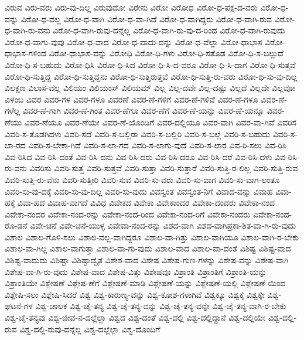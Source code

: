 {ವಿರುವ
ವಿರು-ವರು
ವಿರು-ವು-ದಿಲ್ಲ
ವಿರುವುದೋ
ವಿರೇನು
ವಿರೋ
ವಿರೋಧ
ವಿರೋ-ಧ-ಪಕ್ಷ-ದ-ವರು
ವಿರೋ-ಧ-ವನ್ನು
ವಿರೋ-ಧ-ವಲ್ಲ
ವಿರೋ-ಧ-ವಾಗಿ
ವಿರೋ-ಧ-ವಾ-ಗಿದೆ
ವಿರೋ-ಧ-ವಾಗಿದ್ದರು
ವಿರೋ-ಧ-ವಾಗಿ-ರುವ
ವಿರೋ-ಧ-ವಾಗಿ-ರು-ವನು
ವಿರೋ-ಧ-ವಾಗಿ-ರುವು-ದನ್ನೆಲ್ಲ
ವಿರೋ-ಧ-ವಾಗಿ-ರು-ವು-ದ-ರಿಂದ
ವಿರೋ-ಧ-ವಾಗಿ-ರುವುದು
ವಿರೋ-ಧ-ವಾಗು-ವುವು
ವಿರೋ-ಧ-ವಾದ
ವಿರೋ-ಧ-ವಾದು-ದನ್ನು
ವಿರೋ-ಧ-ವೆಲ್ಲಾ
ವಿರೋ-ಧಾಭಾಸ
ವಿರೋ-ಧಾಭಾಸ-ಗಳಿಂದ
ವಿರೋ-ಧಾಭಾಸ-ವನ್ನು
ವಿರೋಧಿ
ವಿರೋ-ಧಿ-ಗಳು
ವಿರೋ-ಧಿ-ಸತೊಡ
ವಿರೋ-ಧಿ-ಸ-ಬಲ್ಲುದೆ
ವಿರೋ-ಧಿ-ಸ-ಬಹುದು
ವಿರೋ-ಧಿಸಿ
ವಿರೋ-ಧಿ-ಸಿದ
ವಿರೋ-ಧಿ-ಸಿ-ದ-ವರೂ
ವಿರೋ-ಧಿ-ಸಿ-ದಾಗ
ವಿರೋ-ಧಿ-ಸುತ್ತವೆ
ವಿರೋ-ಧಿ-ಸುತ್ತಿದ್ದ
ವಿರೋ-ಧಿ-ಸುತ್ತಿದ್ದನು
ವಿರೋ-ಧಿ-ಸುತ್ತಿರುತ್ತವೆ
ವಿರೋ-ಧಿ-ಸುತ್ತಿ-ರು-ವರು
ವಿರೋ-ಧಿ-ಸು-ವು-ದಿಲ್ಲ
ವಿಲಕ್ಷಣ
ವಿಲಾಸ-ವೆಲ್ಲ
ವಿಲಿಯಂ
ವಿಲಿಯಂಸ್
ವಿಲಿಯಮ್
ವಿಲ್ಲ
ವಿಲ್ಲ-ದವೇ
ವಿಲ್ಲ-ದಷ್ಟು
ವಿಲ್ಲದೆ
ವಿಲ್ಲದೇ
ವಿಲ್ಲವೋ
ವಿಳಂಬ
ವಿವರ
ವಿವರ-ಗಳ
ವಿವರ-ಗಳೂ
ವಿವರಣೆ
ವಿವರ-ಣೆ-ಗಳಿಗೆ
ವಿವರ-ಣೆ-ಗಳಿವೆ
ವಿವರ-ಣೆ-ಗಳೂ
ವಿವರ-ಣೆ-ಗಳೆಲ್ಲ
ವಿವರ-ಣೆ-ಗಾಗಿ
ವಿವರ-ಣೆ-ಗಿಂತ
ವಿವರ-ಣೆಗೂ
ವಿವರ-ಣೆಗೆ
ವಿವರ-ಣೆ-ಯನ್ನು
ವಿವರ-ಣೆ-ಯನ್ನೂ
ವಿವರ-ಣೆಯು
ವಿವರ-ಣೆಯೂ
ವಿವರ-ಣೆಯೇ
ವಿವರ-ಣೆ-ಯೊಂದಿಗೆ
ವಿವರ-ದಲ್ಲಿಯೂ
ವಿವರ-ವಾಗಿ
ವಿವರ-ವಾ-ಗಿವೆ
ವಿವರಿಸ
ವಿವರಿ-ಸ-ತೊಡಗಿದಳು
ವಿವರಿ-ಸದೆ
ವಿವರಿ-ಸ-ಬಲ್ಲಿರಾ
ವಿವರಿ-ಸ-ಬಲ್ಲಿರಿ
ವಿವರಿ-ಸ-ಬಲ್ಲೆ
ವಿವರಿ-ಸ-ಬಹುದು
ವಿವರಿ-ಸ-ಬಾ-ರದ
ವಿವರಿ-ಸ-ಬೇಕಾ-ಗಿದೆ
ವಿವರಿ-ಸ-ಲಾ-ಗದ
ವಿವರಿ-ಸ-ಲಾಗು-ವುದೆ
ವಿವರಿ-ಸ-ಲಾರ
ವಿವ-ರಿ-ಸಲು
ವಿವ-ರಿಸಿ
ವಿವ-ರಿಸಿದ
ವಿವ-ರಿಸಿ-ದಂತೆ
ವಿವ-ರಿಸಿ-ದನು
ವಿವ-ರಿಸಿ-ದರು
ವಿವ-ರಿಸಿ-ದರೂ
ವಿವ-ರಿಸಿ-ದರೆ
ವಿವ-ರಿಸಿ-ದಳು
ವಿವ-ರಿಸಿ-ರು-ವನು
ವಿವರಿಸು
ವಿವರಿ-ಸುತ್ತ
ವಿವರಿ-ಸುತ್ತವೆ
ವಿವರಿ-ಸುತ್ತಾ
ವಿವರಿ-ಸುತ್ತಾರೆ
ವಿವರಿ-ಸುತ್ತಿ-ರ-ಲಿಲ್ಲ
ವಿವರಿ-ಸುತ್ತಿ-ರುವ
ವಿವರಿ-ಸುತ್ತಿ-ರು-ವೆನು
ವಿವರಿ-ಸುತ್ತೀರಿ
ವಿವರಿ-ಸುವ
ವಿವರಿ-ಸು-ವರು
ವಿವರಿ-ಸು-ವಾಗ
ವಿವರಿ-ಸು-ವಾಗ-ಲಂತೂ
ವಿವರಿ-ಸು-ವು-ದಕ್ಕೆ
ವಿವರಿ-ಸು-ವು-ದಿಲ್ಲ
ವಿವರಿ-ಸು-ವುದು
ವಿವಸ್ವಂತ
ವಿವಸ್ವಂತ-ನಿಗೆ
ವಿವಾದ-ವನ್ನು
ವಿವಾಹ
ವಿವಾ-ಹಕ್ಕೆ
ವಿವಾ-ಹದ
ವಿವಾಹ-ವಾಗದೆ
ವಿವಿಧ
ವಿವೇಕದ
ವಿವೇಕಾ
ವಿವೇಕಾಂದರ
ವಿವೇಕಾ-ದಂದರು
ವಿವೇಕಾ-ನಂದ
ವಿವೇಕಾ-ನಂದರ
ವಿವೇಕಾ-ನಂದ-ರನ್ನು
ವಿವೇಕಾ-ನಂದ-ರಿಂದ
ವಿವೇಕಾ-ನಂದ-ರಿಗೆ
ವಿವೇಕಾ-ನಂದರು
ವಿವೇಕಾ-ನಂದ-ರೊ-ಡನೆ
ವಿವೇ-ಚನೆ
ವಿವೇ-ಚನೆ-ಯುಳ್ಳ
ವಿವೇವಾ-ನಂದ-ರನ್ನು
ವಿಶದ-ವಾಗಿ
ವಿಶದ-ವಾಗಿಪ್ರಕಾ-ಶಿತ-ವಾ-ಗಿ-ರು-ವುದು
ವಿಶಾಲ
ವಿಶಾಲ-ಗೊಳಿ-ಸಲು
ವಿಶಾಲ-ವಲ್ಲ-ವಾಗಿದ್ದರೂ
ವಿಶಾಲ-ವಾ-ಗಿತ್ತು
ವಿಶಾಲ-ವಾಗಿಯೂ
ವಿಶಾಲ-ವಾಗಿ-ರ-ಬೇಕು
ವಿಶಾಲ-ವಾ-ಗಿಲ್ಲ
ವಿಶಾಲ-ವಾಗುತ್ತಾ
ವಿಶಾಲ-ವಾ-ಗು-ವುದು
ವಿಶಾಲ-ವಾದ
ವಿಶಾಲ-ವಾ-ದಂತೆ
ವಿಶಿಷ್ಟ
ವಿಶಿಷ್ಟ-ವಾದ
ವಿಶಿಷ್ಟ-ವಾದುದು
ವಿಶಿಷ್ಟಾ
ವಿಶಿಷ್ಟಾದ್ವೈತ
ವಿಶೇಶ-ವಾದ
ವಿಶೇಷ
ವಿಶೇಷ-ಗುಣ-ಗಳನ್ನು
ವಿಶೇಷ-ವನ್ನು
ವಿಶೇಷ-ವಾಗಿ
ವಿಶೇಷ-ವಾ-ಗಿ-ರು-ವುದು
ವಿಶೇಷ-ವಾದ
ವಿಶೇಷ-ವಿತ್ತು
ವಿಶೇಷವೂ
ವಿಶ್ರಾಂತಿ
ವಿಶ್ರಾಂತಿಗೆ
ವಿಶ್ರಾಂತಿ-ಯನ್ನು
ವಿಶ್ರಾಂತಿಯೇ
ವಿಶ್ಲೇಷಣೆ
ವಿಶ್ಲೇಷ-ಣೆಗೆ
ವಿಶ್ಲೇಷಣೆ-ಮಾಡಿ
ವಿಶ್ಲೇಷಣೆ-ಯನ್ನು
ವಿಶ್ಲೇಷಣೆ-ಯಲ್ಲಿ
ವಿಶ್ಲೇಷಣೆ-ಯಿಂದ
ವಿಶ್ಲೇಷಿ-ಸಲು
ವಿಶ್ಲೇಷಿ-ಸಿದರೆ
ವಿಶ್ವ
ವಿಶ್ವ-ಕಾರುಣ್ಯ-ವನ್ನು
ವಿಶ್ವ-ಕೋಶ-ಗಳಾಗಿವೆ
ವಿಶ್ವಕ್ಕೂ
ವಿಶ್ವಕ್ಕೆ
ವಿಶ್ವಕ್ಕೇ
ವಿಶ್ವ-ಘಟನೆ-ಗಳ
ವಿಶ್ವ-ಚಾಲಕ
ವಿಶ್ವ-ಚೈ-ತನ್ಯ
ವಿಶ್ವ-ಚೈ-ತನ್ಯ-ವನ್ನು
ವಿಶ್ವ-ಚೈ-ತನ್ಯ-ವನ್ನೇ
ವಿಶ್ವ-ಚೈ-ತನ್ಯ-ವಾಗಿ-ರ-ಬೇಕು
ವಿಶ್ವ-ಚೈ-ತನ್ಯವು
ವಿಶ್ವ-ಜೀವ-ನ-ದಲ್ಲೆಲ್ಲಾ
ವಿಶ್ವದ
ವಿಶ್ವ-ದಂತೆ
ವಿಶ್ವ-ದಲ್ಲಿ
ವಿಶ್ವ-ದಲ್ಲಿದ್ದಾನೆ
ವಿಶ್ವ-ದಲ್ಲಿಯೇ
ವಿಶ್ವ-ದಲ್ಲಿ-ರುವ
ವಿಶ್ವ-ದಲ್ಲಿ-ರುವು-ದನ್ನೆಲ್ಲ
ವಿಶ್ವ-ದಲ್ಲೆಲ್ಲಾ
ವಿಶ್ವ-ದೊಂದಿಗೆ
}
